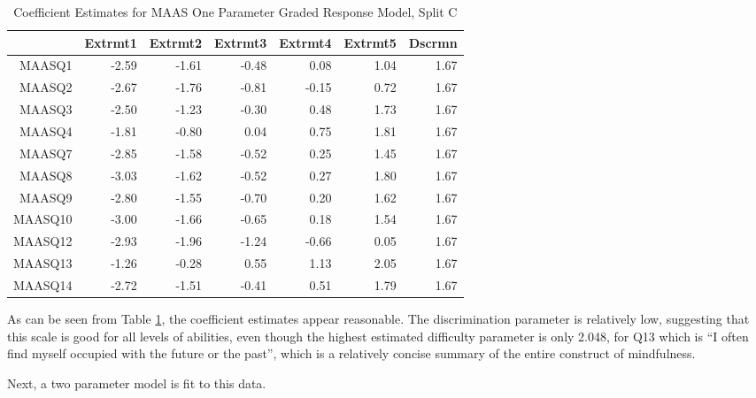 \documentclass{article}
\begin{document}
\begin{table}[ht]
\centering
\begin{tabular}{rrrrrrr}
  \hline
 & Extrmt1 & Extrmt2 & Extrmt3 & Extrmt4 & Extrmt5 & Dscrmn \\ 
  \hline
MAASQ1 & -2.59 & -1.61 & -0.48 & 0.08 & 1.04 & 1.67 \\ 
  MAASQ2 & -2.67 & -1.76 & -0.81 & -0.15 & 0.72 & 1.67 \\ 
  MAASQ3 & -2.50 & -1.23 & -0.30 & 0.48 & 1.73 & 1.67 \\ 
  MAASQ4 & -1.81 & -0.80 & 0.04 & 0.75 & 1.81 & 1.67 \\ 
  MAASQ7 & -2.85 & -1.58 & -0.52 & 0.25 & 1.45 & 1.67 \\ 
  MAASQ8 & -3.03 & -1.62 & -0.52 & 0.27 & 1.80 & 1.67 \\ 
  MAASQ9 & -2.80 & -1.55 & -0.70 & 0.20 & 1.62 & 1.67 \\ 
  MAASQ10 & -3.00 & -1.66 & -0.65 & 0.18 & 1.54 & 1.67 \\ 
  MAASQ12 & -2.93 & -1.96 & -1.24 & -0.66 & 0.05 & 1.67 \\ 
  MAASQ13 & -1.26 & -0.28 & 0.55 & 1.13 & 2.05 & 1.67 \\ 
  MAASQ14 & -2.72 & -1.51 & -0.41 & 0.51 & 1.79 & 1.67 \\ 
   \hline
\end{tabular}
\caption{Coefficient Estimates for MAAS One Parameter Graded Response Model, Split C} 
\label{tab:maas2cgrm1pl}
\end{table}

As can be seen from Table \ref{tab:maas2cgrm1pl}, the coefficient estimates appear reasonable. The discrimination parameter is relatively low, suggesting that this scale is good for all levels of abilities, even though the highest estimated difficulty parameter is only 2.048, for Q13 which is ``I often find myself occupied with the future or the past'', which is a relatively concise summary of the entire construct of mindfulness. 

Next, a two parameter model is fit to this data. 
\end{document}
